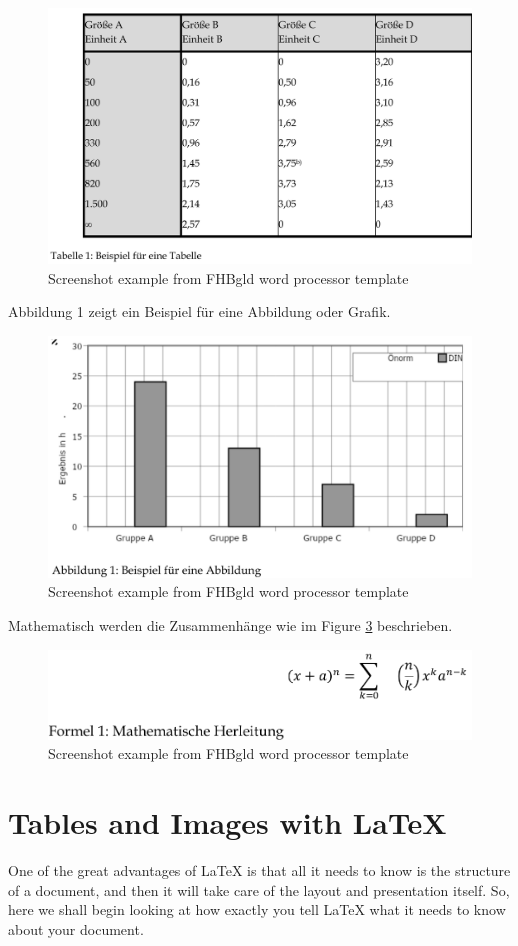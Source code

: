 \begin{figure}[ht]
	\centering
	\includegraphics[width=0.7\linewidth]{figures/Word_Table}
	\caption{Screenshot example from FHBgld word processor template}
	\label{fig:wordtable}
\end{figure}
Abbildung 1 zeigt ein Beispiel für eine Abbildung oder Grafik.
\begin{figure}
	\centering
	\includegraphics[width=0.7\linewidth]{figures/Word_Diagram}
	\caption{Screenshot example from FHBgld word processor template}
	\label{fig:worddiagram}
\end{figure}
\linebreak
Mathematisch werden die Zusammenhänge wie im Figure \ref{fig:wordformel} beschrieben.
\begin{figure}
	\centering
	\includegraphics[width=0.7\linewidth]{figures/Word_Formel}
	\caption{Screenshot example from FHBgld word processor template}
	\label{fig:wordformel}
\end{figure}

\section{Tables and Images with \LaTeX}
One of the great advantages of \LaTeX{} is that all it needs to know is
the structure of a document, and then it will take care of the layout
and presentation itself.  So, here we shall begin looking at how exactly
you tell \LaTeX{} what it needs to know about your document.

